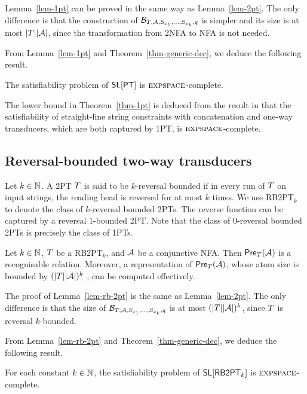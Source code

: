 Lemma~\ref{lem-1pt} can be proved in the same way as Lemma~\ref{lem-2pt}. The only difference is that the construction of $\mathcal{B}_{T, \mathcal{A}, S_{x_1}, \ldots, S_{x_k}, q}$ is simpler and its size is at most $|T| |\mathcal{A}|$, since the transformation from  2NFA to NFA is not needed.

From Lemma~\ref{lem-1pt} and Theorem~\ref{thm-generic-dec}, we deduce the following result.
%
\begin{theorem} \label{thm-1pt}
The satisfiability problem of $\textsf{SL}[\textsf{PT}]$ is $\textsc{expspace}$-complete. 
\end{theorem}

The lower bound in Theorem~\ref{thm-1pt} is deduced from the result in \cite{LB16} that the satisfiability of straight-line string constraints with concatenation and one-way transducers, which are both captured by 1PT, is $\textsc{expspace}$-complete.

\subsection{Reversal-bounded two-way transducers}

Let $k \in \mathbb{N}$. A 2PT $T$ is said  to be $k$-reversal bounded if in every run of $T$ on input strings, the reading head is reversed for at most $k$ times. We use  RB2PT$_k$ to denote the class of $k$-reversal bounded 2PTs. The reverse function can be captured by a reversal $1$-bounded 2PT.
Note that the class of $0$-reversal bounded 2PTs is precisely the class of 1PTs.

\begin{lemma}\label{lem-rb-2pt}
Let $k \in \mathbb{N}$, $T$ be a RB2PT$_k$, and $\mathcal{A}$ be a conjunctive NFA. Then $\textsf{Pre}_{T}(\mathcal{A})$ is a recognisable relation. Moreover, a representation of $\textsf{Pre}_{T}(\mathcal{A})$, whose atom size is bounded by $(|T||\mathcal{A}|)^k$ , can be computed effectively.
\end{lemma}

The proof of Lemma~\ref{lem-rb-2pt} is the same as Lemma~\ref{lem-2pt}. The only difference is that the size of $\mathcal{B}_{T, \mathcal{A}, S_{x_1}, \ldots, S_{x_k}, q}$ is at most $(|T| |\mathcal{A}|)^k$, since $T$ is reversal $k$-bounded.

From Lemma~\ref{lem-rb-2pt} and Theorem~\ref{thm-generic-dec}, we deduce the following result.
%
\begin{theorem} \label{thm-rb-2pt}
For each constant $k \in \mathbb{N}$, the satisfiability problem of $\textsf{SL}[\textsf{RB2PT}_k]$ is $\textsc{expspace}$-complete. 
\end{theorem}


